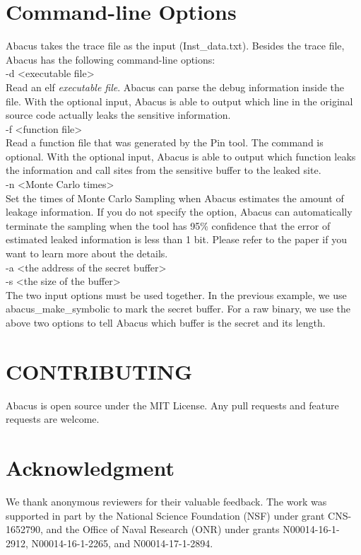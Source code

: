 \documentclass[10pt,conference]{IEEEtran}
\newcommand{\tool}{\textsf{Abacus}}
\begin{document}
\section{Command-line Options}
\tool{} takes the trace file as the input (\textsf{Inst\_data.txt}). Besides the trace file, \tool{} has the following command-line options:
\vspace{3pt}
\\\textsf{-d {<executable file>}}
\\ Read an elf \textit{executable file}. \tool{} can parse the debug information inside the file. With the optional input, \tool{} is able to output which line in the original source code actually leaks the sensitive information.
\vspace{3pt}
\\\textsf{-f {<function file>}}
\\Read a function file that was generated by the Pin tool. The command is optional. With the optional input, \tool{} is able to output which function leaks the information and call sites from the sensitive buffer to the leaked site.
\vspace{3pt}
\\\textsf{-n {<Monte Carlo times>}}
\\ Set the times of Monte Carlo Sampling when \tool{} estimates the amount of leakage information. If you do not specify the option, \tool{} can automatically terminate the sampling when the tool has 95\% confidence that the error of estimated leaked information is less than 1 bit. Please refer to the paper if you want to learn more about the details.
\vspace{3pt}
\\\textsf{-a {<the address of the secret buffer>} \\-s {<the size of the buffer>}}
\\The two input options must be used together. In the previous example, we use \textsf{abacus\_make\_symbolic} to mark the secret buffer. For a raw binary, we use the above two options to tell \tool{} which buffer is the secret and its length.

\section{CONTRIBUTING}
\tool{} is open source under the MIT License. Any pull requests and feature requests are welcome.

\section*{Acknowledgment}
We thank anonymous reviewers for their valuable feedback. The work was supported in part by the National Science Foundation (NSF) under grant CNS-1652790, and the Office of Naval Research (ONR) under grants N00014-16-1-2912, N00014-16-1-2265, and N00014-17-1-2894. 




\end{document}
